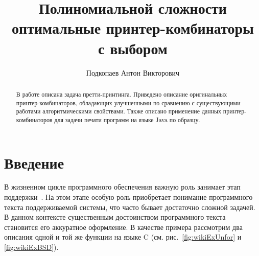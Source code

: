 \graphicspath{{Podkopaev/images/}}%



\title{Полиномиальной сложности\\
оптимальные принтер-комбинаторы\\ 
с выбором}
%
\author{Подкопаев Антон Викторович}
%
%
%

\maketitle              %

\begin{abstract}
В работе описана задача претти-принтинга. Приведено описание оригинальных
принтер-комбинаторов, обладающих улучшенными по сравнению с существующими 
работами алгоритмическими свойствами.
Также описано применение данных принтер-комбинаторов для задачи печати программ на
языке Java по образцу.
\end{abstract}

\section*{Введение}

В жизненном цикле программного обеспечения важную роль занимает этап
поддержки~\cite{maintance}. На этом этапе особую роль приобретает
понимание программного текста поддерживаемой системы, что часто бывает
достаточно сложной задачей. В данном контексте существенным достоинством
программного текста становится его аккуратное оформление.
В качестве примера рассмотрим два описания одной и той же функции на языке C
(см. рис.~\ref{fig:wikiExUnfor} и \ref{fig:wikiExBSD}).


